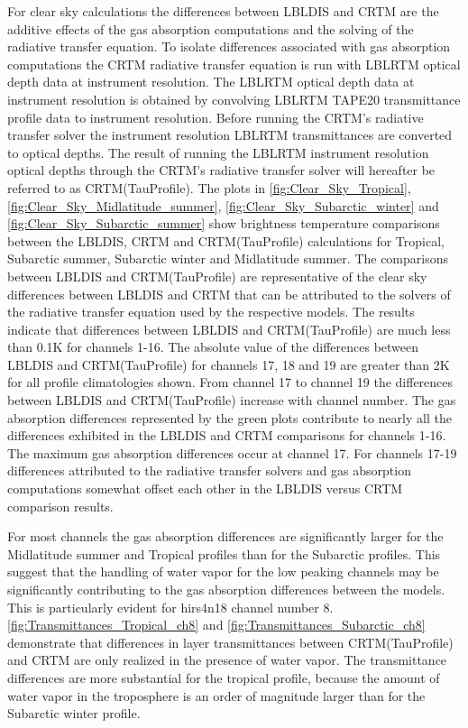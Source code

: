 For clear sky calculations the differences between LBLDIS and CRTM are the additive effects of the gas absorption computations and the solving of the radiative transfer equation. To isolate  differences associated with gas absorption computations the CRTM radiative transfer equation is run with LBLRTM optical depth data at instrument resolution. The LBLRTM optical depth data at instrument resolution is obtained by convolving LBLRTM TAPE20 transmittance profile data to instrument resolution. Before running the CRTM's radiative transfer solver the instrument resolution LBLRTM transmittances are converted to optical depths. The result of running the LBLRTM instrument resolution optical depths through the CRTM's radiative transfer solver will hereafter be referred to as CRTM(TauProfile). The plots in \ref{fig:Clear_Sky_Tropical}, \ref{fig:Clear_Sky_Midlatitude_summer}, \ref{fig:Clear_Sky_Subarctic_winter} and \ref{fig:Clear_Sky_Subarctic_summer} show brightness temperature comparisons between the LBLDIS, CRTM and CRTM(TauProfile) calculations for Tropical, Subarctic summer, Subarctic winter and Midlatitude summer. The comparisons between LBLDIS and CRTM(TauProfile) are representative of the clear sky differences between LBLDIS and CRTM that can be attributed to the solvers of the radiative transfer equation used by the 
respective models. The results indicate that differences between LBLDIS and CRTM(TauProfile) are much less than 0.1K for channels 1-16.
The absolute value of the differences between LBLDIS and CRTM(TauProfile) for channels 17, 18 and 19 are greater than 2K for all profile climatologies shown. From channel 17 to channel 19 the differences between LBLDIS and CRTM(TauProfile) increase with channel number. The gas absorption differences represented by the green plots contribute to nearly all the differences exhibited in the LBLDIS and CRTM comparisons for channels 1-16. The maximum gas absorption differences occur at channel 17. For channels 17-19 differences attributed to the radiative transfer solvers and gas absorption computations somewhat offset each other in the LBLDIS versus CRTM comparison results. 

For most channels the gas absorption differences are significantly larger for the Midlatitude summer and Tropical profiles than for the Subarctic profiles. This suggest that the handling of water vapor for the low peaking channels may be significantly contributing to the gas absorption differences between the models. This is particularly evident for hirs4\textunderscore{}n18 channel number 8. \ref{fig:Transmittances_Tropical_ch8} and \ref{fig:Transmittances_Subarctic_ch8} demonstrate that differences in layer transmittances
between CRTM(TauProfile) and CRTM are only realized in the presence of water vapor. The transmittance differences are more substantial for the tropical profile, because the amount
of water vapor in the troposphere is an order of magnitude larger than for the Subarctic winter profile. 

